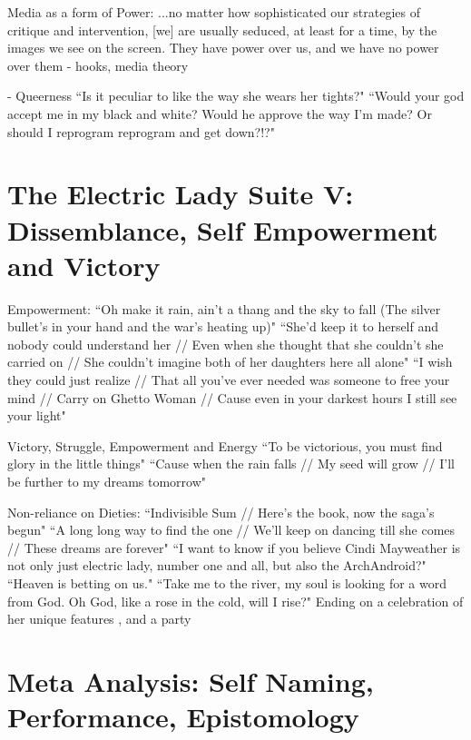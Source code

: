 \documentclass[a4paper, 11pt]{article} %
\begin{document}
Media as a form of Power:
...no matter how sophisticated our strategies of critique and intervention, [we] are usually seduced, at least for a time, by the images we see on the screen. They have power over us, and we have no power over them - hooks, media theory

- Queerness
``Is it peculiar to like the way she wears her tights?" \cite{queen}
``Would your god accept me in my black and white? Would he approve the way I'm made? Or should I reprogram reprogram and get down?!?" \cite{queen}


\section*{The Electric Lady Suite V: Dissemblance, Self Empowerment and Victory}

Empowerment: 
``Oh make it rain, ain't a thang and the sky to fall (The silver bullet's in your hand and the war's heating up)" \cite{manymoons}
``She'd keep it to herself and nobody could understand her // Even when she thought that she couldn't she carried on // She couldn't imagine both of her daughters here all alone" \cite{ghettowoman}
``I wish they could just realize // That all you've ever needed was someone to free your mind // Carry on Ghetto Woman // Cause even in your darkest hours I still see your light" \cite{ghettowoman}

Victory, Struggle, Empowerment and Energy
``To be victorious, you must find glory in the little things" \cite{victory}
``Cause when the rain falls // My seed will grow // I'll be further to my dreams tomorrow" \cite{victory}


Non-reliance on Dieties:
``Indivisible Sum // Here's the book, now the saga's begun" \cite{fiveseveneighttwoone}
``A long long way to find the one // We'll keep on dancing till she comes // These dreams are forever" \cite{danceordie}
``I want to know if you believe Cindi Mayweather is not only just electric lady, number one and all, but also the ArchAndroid?" \cite{favoritefugitive}
``Heaven is betting on us." \cite{primetime}
``Take me to the river, my soul is looking for a word from God. Oh God, like a rose in the cold, will I rise?" \cite{sallyride}
Ending on a celebration of her unique features \cite{dandridgeeyes}, and a party \cite{whatanexperience}


\section*{Meta Analysis: Self Naming, Performance, Epistomology}
\end{document}
